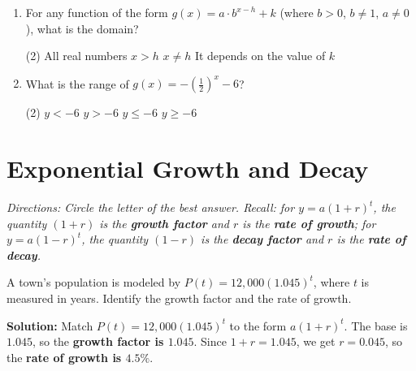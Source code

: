 \documentclass[11pt]{article}
\begin{document}
\begin{enumerate}[leftmargin=1.5em, itemsep=10pt]
\item For any function of the form $g(x) = a \cdot b^{x-h} + k$ (where $b>0$, $b \neq 1$, $a \neq 0$), what is the domain?
\begin{tasks}(2)
  \task All real numbers
  \task $x > h$
  \task $x \neq h$
  \task It depends on the value of $k$
\end{tasks}

\item What is the range of $g(x) = -\left(\tfrac{1}{2}\right)^x - 6$?
\begin{tasks}(2)
  \task $y < -6$
  \task $y > -6$
  \task $y \leq -6$
  \task $y \geq -6$
\end{tasks}

\end{enumerate}

\newpage
\section{Exponential Growth and Decay}
\textit{Directions: Circle the letter of the best answer. Recall: for $y = a(1+r)^t$, the quantity $(1+r)$ is the \textbf{growth factor} and $r$ is the \textbf{rate of growth}; for $y = a(1-r)^t$, the quantity $(1-r)$ is the \textbf{decay factor} and $r$ is the \textbf{rate of decay}.}

\begin{example}
A town's population is modeled by $P(t) = 12{,}000(1.045)^t$, where $t$ is measured in years. Identify the growth factor and the rate of growth.

\textbf{Solution:} Match $P(t) = 12{,}000(1.045)^t$ to the form $a(1+r)^t$.
The base is $1.045$, so the \textbf{growth factor is $1.045$}.
Since $1 + r = 1.045$, we get $r = 0.045$, so the \textbf{rate of growth is $4.5\%$}.
\end{example}
\end{document}
